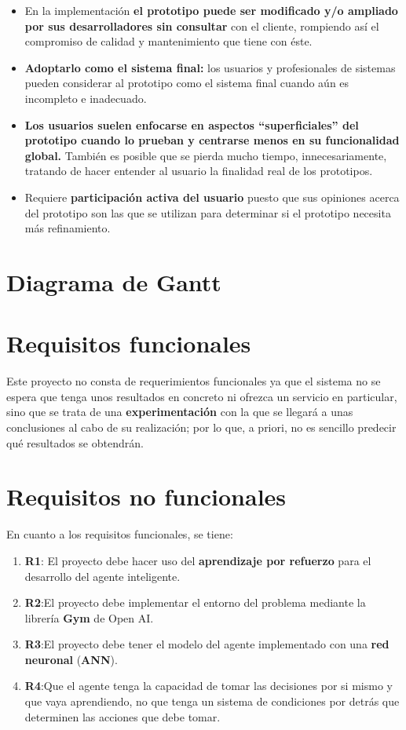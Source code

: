 \begin{itemize}
    \item En la implementación \textbf{el prototipo puede ser modificado y/o ampliado por sus desarrolladores sin consultar} con el cliente, rompiendo así el compromiso de calidad y mantenimiento que tiene con éste.
    \item \textbf{Adoptarlo como el sistema final:} los usuarios y profesionales de sistemas pueden considerar al prototipo como el sistema final cuando aún es incompleto e inadecuado.
    \item \textbf{Los usuarios suelen enfocarse en aspectos “superficiales” del prototipo cuando lo prueban y centrarse menos en su funcionalidad global.} También es posible que se pierda mucho tiempo, innecesariamente, tratando de hacer entender al usuario la finalidad real de los prototipos.
    \item Requiere \textbf{participación activa del usuario} puesto que sus opiniones acerca del prototipo son las que se utilizan para determinar si el prototipo necesita más refinamiento. 
    \end{itemize}

\section{Diagrama de Gantt}

\section{Requisitos funcionales}

Este proyecto no consta de requerimientos funcionales ya que el sistema no se espera que tenga unos resultados en concreto ni ofrezca un servicio en particular, sino que se trata de una \textbf{experimentación} con la que se llegará a unas conclusiones al cabo de su realización; por lo que, a priori, no es sencillo predecir qué resultados se obtendrán. 
\section{Requisitos no funcionales}

En cuanto a los requisitos funcionales, se tiene: 

\begin{enumerate}
    \item \textbf{R1}: El proyecto debe hacer uso del \textbf{aprendizaje por refuerzo} para el desarrollo del agente inteligente.
    \item \textbf{R2}:El proyecto debe implementar el entorno del problema mediante la librería \textbf{Gym} de Open AI.
    \item \textbf{R3}:El proyecto debe tener el modelo del agente implementado con una \textbf{red neuronal} (\textbf{ANN}).
    \item \textbf{R4}:Que el agente tenga la capacidad de tomar las decisiones por si mismo y que vaya aprendiendo, no que tenga un sistema de condiciones por detrás que determinen las acciones que debe tomar.
\end{enumerate}


